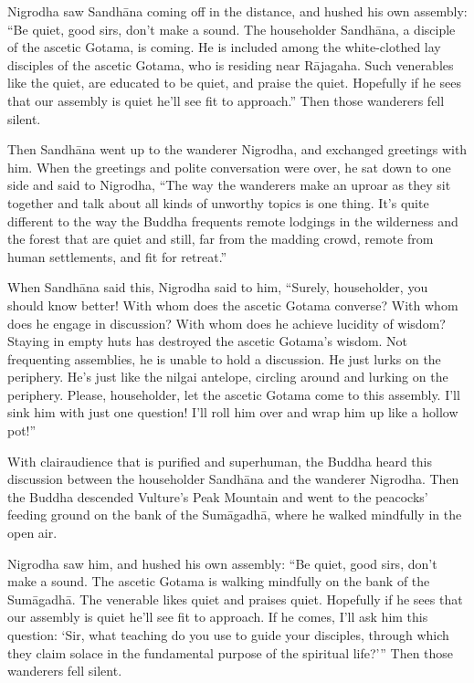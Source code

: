\documentclass[12pt,openany]{book}%
\begin{document}
Nigrodha saw \textsanskrit{Sandhāna} coming off in the distance, and hushed his own assembly: “Be quiet, good sirs, don’t make a sound. The householder \textsanskrit{Sandhāna}, a disciple of the ascetic Gotama, is coming. He is included among the white-clothed lay disciples of the ascetic Gotama, who is residing near \textsanskrit{Rājagaha}. Such venerables like the quiet, are educated to be quiet, and praise the quiet. Hopefully if he sees that our assembly is quiet he’ll see fit to approach.” Then those wanderers fell silent. 

Then \textsanskrit{Sandhāna} went up to the wanderer Nigrodha, and exchanged greetings with him. When the greetings and polite conversation were over, he sat down to one side and said to Nigrodha, “The way the wanderers make an uproar as they sit together and talk about all kinds of unworthy topics is one thing. It’s quite different to the way the Buddha frequents remote lodgings in the wilderness and the forest that are quiet and still, far from the madding crowd, remote from human settlements, and fit for retreat.” 

When \textsanskrit{Sandhāna} said this, Nigrodha said to him, “Surely, householder, you should know better! With whom does the ascetic Gotama converse? With whom does he engage in discussion? With whom does he achieve lucidity of wisdom? Staying in empty huts has destroyed the ascetic Gotama’s wisdom. Not frequenting assemblies, he is unable to hold a discussion. He just lurks on the periphery. He’s just like the nilgai antelope, circling around and lurking on the periphery. Please, householder, let the ascetic Gotama come to this assembly. I’ll sink him with just one question! I’ll roll him over and wrap him up like a hollow pot!” 

With clairaudience that is purified and superhuman, the Buddha heard this discussion between the householder \textsanskrit{Sandhāna} and the wanderer Nigrodha. Then the Buddha descended Vulture’s Peak Mountain and went to the peacocks’ feeding ground on the bank of the \textsanskrit{Sumāgadhā}, where he walked mindfully in the open air. 

Nigrodha saw him, and hushed his own assembly: “Be quiet, good sirs, don’t make a sound. The ascetic Gotama is walking mindfully on the bank of the \textsanskrit{Sumāgadhā}. The venerable likes quiet and praises quiet. Hopefully if he sees that our assembly is quiet he’ll see fit to approach. If he comes, I’ll ask him this question: ‘Sir, what teaching do you use to guide your disciples, through which they claim solace in the fundamental purpose of the spiritual life?’” Then those wanderers fell silent. 
\end{document}
